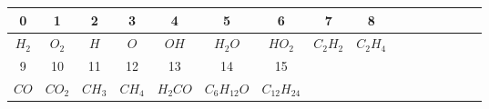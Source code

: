 \begin{table}[h]
\begin{center}
\begin{threeparttable}


\begin{tabular}{cccccccccccccccc}
\toprule
0 & 1 & 2 & 3 & 4 & 5 & 6 & 7 & 8\\
\midrule
$H_2$ & $O_2$ & $H$ & $O$ & $OH$ & $H_2O$ & $HO_2$ & $C_2H_2$ & $C_2H_4$\\ 

\midrule
9 & 10 & 11 & 12 & 13 & 14 & 15 & \\
\midrule
$CO$ & $CO_2$ & $CH_3$ & $CH_4$ & $H_2CO$ & $C_6H_{12}O$ & $C_{12}H_{24}$ & \\
\bottomrule
\end{tabular}


\label{table:spmap}
\end{threeparttable}
\end{center}
\end{table}

